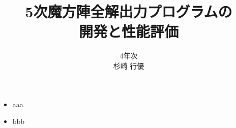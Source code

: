 \documentclass[a4paper,landscape,25pt]{foils}
\title{5次魔方陣全解出力プログラムの \\ 開発と性能評価}
\author{4年次 \\ 杉崎 行優}
\begin{document}
\maketitle

\begin{itemize}
\item aaa
\item bbb
\end{itemize}
\end{document}
